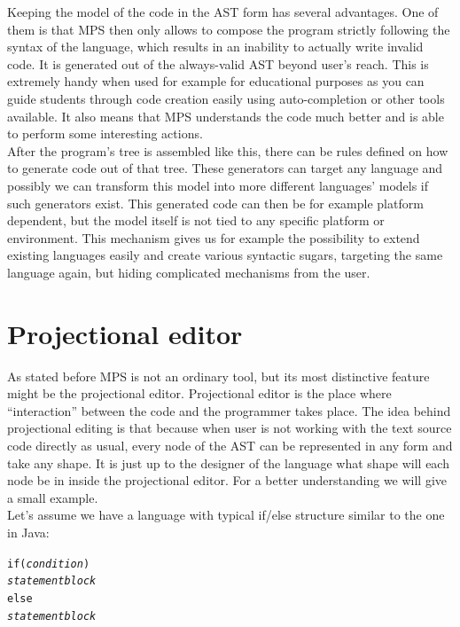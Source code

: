Keeping the model of the code in the AST form has several advantages. One of them is that  MPS then only allows to compose the program strictly following the syntax of the language, which results in an inability to actually write invalid code. It is generated out of the always-valid AST beyond user's reach. This is extremely handy when used for example for educational purposes as you can guide students through code creation easily using auto-completion or other tools available. It also means that MPS understands the code much better and is able to perform some interesting actions.
\\

After the program's tree is assembled like this, there can be rules defined on how to generate code out of that tree. These generators can target any language and possibly we can transform this model into more different languages' models if such generators exist. This generated code can then be for example platform dependent, but the model itself is not tied to any specific platform or environment. This mechanism gives us for example the possibility to extend existing languages easily and create various syntactic sugars, targeting the same language again, but hiding complicated mechanisms from the user.

\section{Projectional editor}
As stated before MPS is not an ordinary tool, but its most distinctive feature might be the projectional editor. Projectional editor is the place where “interaction” between the code and the programmer takes place. The idea behind projectional editing is that because when user is not working with the text source code directly as usual, every node of the AST can be represented in any form and take any shape. It is just up to the designer of the language what shape will each node be in inside the projectional editor. For a better understanding we will give a small example. 
\\

Let's assume we have a language with typical if/else structure similar to the one in Java:

\begin{center}
	\begin{minipage}{.33\textwidth}
		\begin{alltt}
			if (\textit{condition}) 
			    \textit{statement block}
			else
			    \textit{statement block}
		\end{alltt}
	\end{minipage}
\end{center}

